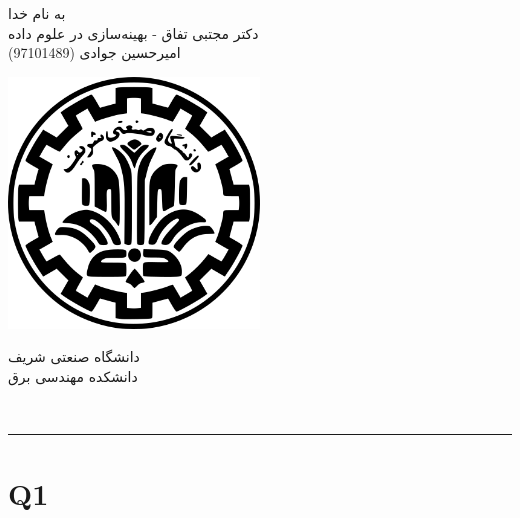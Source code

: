 \documentclass[a4paper]{article}
\begin{document}
\begin{minipage}{0.6\textwidth}
\begin{bf}
\begin{center}
	\large
	به نام خدا\\
دکتر مجتبی تفاق - بهینه‌سازی در علوم داده \\
\Large
\vspace{0.4cm}
امیرحسین جوادی (97101489)
\end{center}
\end{bf}
\normalsize
\end{minipage} \hfill
\begin{minipage}{0.35\textwidth}
\begin{flushleft}
\includegraphics[width=0.5\textwidth]{logo.png}
\end{flushleft}
\begin{flushleft}
	دانشگاه صنعتی شریف\\
	دانشکده مهندسی برق\\
\end{flushleft}

\end{minipage}
\\
\rule[0.1\baselineskip]{\textwidth}{1pt}
\section{Q1}
\end{document}
